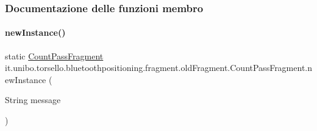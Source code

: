 \subsubsection{Documentazione delle funzioni membro}
\hypertarget{classit_1_1unibo_1_1torsello_1_1bluetoothpositioning_1_1fragment_1_1oldFragment_1_1CountPassFragment_a0a03d5af96a619bfbc6e296447a325e9_a0a03d5af96a619bfbc6e296447a325e9}{}\label{classit_1_1unibo_1_1torsello_1_1bluetoothpositioning_1_1fragment_1_1oldFragment_1_1CountPassFragment_a0a03d5af96a619bfbc6e296447a325e9_a0a03d5af96a619bfbc6e296447a325e9} 
\paragraph{\texorpdfstring{new\+Instance()}{newInstance()}}
{\footnotesize\ttfamily static \hyperlink{classit_1_1unibo_1_1torsello_1_1bluetoothpositioning_1_1fragment_1_1oldFragment_1_1CountPassFragment}{Count\+Pass\+Fragment} it.\+unibo.\+torsello.\+bluetoothpositioning.\+fragment.\+old\+Fragment.\+Count\+Pass\+Fragment.\+new\+Instance (\begin{DoxyParamCaption}\item[{String}]{message }\end{DoxyParamCaption})\hspace{0.3cm}{\ttfamily [static]}}



